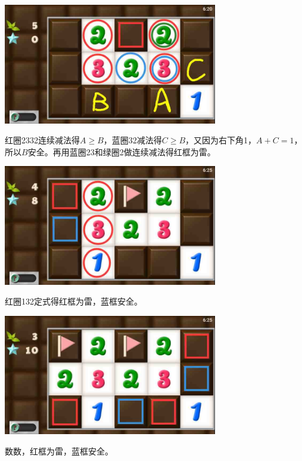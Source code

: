 \subsection{} %
\begin{center}
    \includegraphics[width=0.7\textwidth]{puzzlelow/105-1.jpg}
\end{center}
红圈2332连续减法得$A\ge B$，蓝圈32减法得$C\ge B$，又因为右下角1，$A+C=1$，所以$B$安全。再用蓝圈23和绿圈2做连续减法得红框为雷。
\begin{center}
    \includegraphics[width=0.7\textwidth]{puzzlelow/105-2.jpg}
\end{center}
红圈132定式得红框为雷，蓝框安全。
\begin{center}
    \includegraphics[width=0.7\textwidth]{puzzlelow/105-3.jpg}
\end{center}
数数，红框为雷，蓝框安全。

